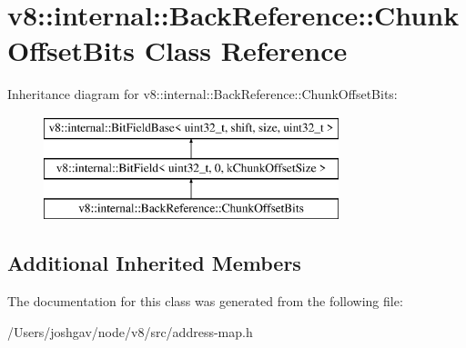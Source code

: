 \hypertarget{classv8_1_1internal_1_1_back_reference_1_1_chunk_offset_bits}{}\section{v8\+:\+:internal\+:\+:Back\+Reference\+:\+:Chunk\+Offset\+Bits Class Reference}
\label{classv8_1_1internal_1_1_back_reference_1_1_chunk_offset_bits}
Inheritance diagram for v8\+:\+:internal\+:\+:Back\+Reference\+:\+:Chunk\+Offset\+Bits\+:\begin{figure}[H]
\begin{center}
\leavevmode
\includegraphics[height=3.000000cm]{classv8_1_1internal_1_1_back_reference_1_1_chunk_offset_bits}
\end{center}
\end{figure}
\subsection*{Additional Inherited Members}


The documentation for this class was generated from the following file\+:\begin{DoxyCompactItemize}
\item 
/\+Users/joshgav/node/v8/src/address-\/map.\+h\end{DoxyCompactItemize}
